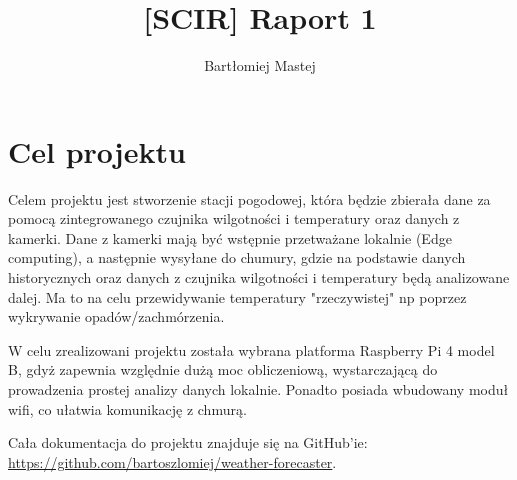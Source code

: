 \documentclass[runningheads]{llncs}
\begin{document}
%
\title{[SCIR] Raport 1}
%

\author{Bartłomiej Mastej}
%
%

%
\maketitle              %
%
%
%
%
\section{Cel projektu}
Celem projektu jest stworzenie stacji pogodowej, która będzie zbierała dane za pomocą zintegrowanego czujnika wilgotności i temperatury oraz danych z kamerki.
Dane z kamerki mają być wstępnie przetważane lokalnie (Edge computing), a następnie wysyłane do chumury, gdzie na podstawie danych historycznych oraz danych z czujnika wilgotności i temperatury będą analizowane dalej. Ma to na celu przewidywanie temperatury "rzeczywistej" np poprzez wykrywanie opadów/zachmórzenia.

W celu zrealizowani projektu została wybrana platforma Raspberry Pi 4 model B, gdyż zapewnia względnie dużą moc obliczeniową, wystarczającą do prowadzenia prostej analizy danych lokalnie. Ponadto posiada wbudowany moduł wifi, co ułatwia komunikację z chmurą.

Cała dokumentacja do projektu znajduje się na GitHub'ie: \url{https://github.com/bartoszlomiej/weather-forecaster}.
\end{document}
